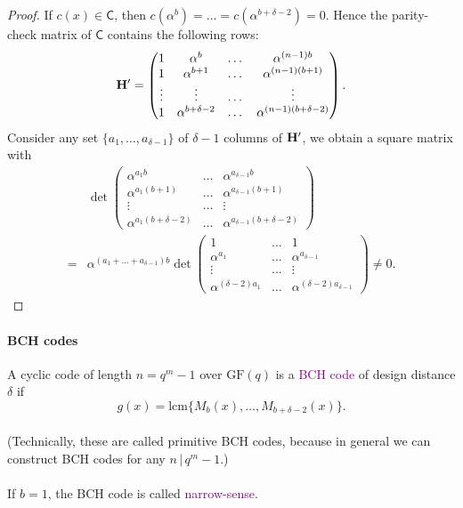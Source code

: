 \documentclass[a4paper, 11pt, openany]{book}
\numberwithin{equation}{section}
\theoremstyle{plain}
\theoremstyle{definition}
\newcommand{\GF}{\mathrm{GF}}
\newcommand{\lcm}{\mathrm{lcm}}
\newcommand{\Define}[1]{\textcolor{purple}{#1}}
\newcommand{\code}[1]{\mathsf{#1}}
\begin{document}
\begin{proof}
If $c(x) \in \code{C}$, then  $c(\alpha^b) = \dots = c(\alpha^{b + \delta - 2}) = 0.$ Hence the parity-check matrix of $\code{C}$ contains the following rows:
$$
	{\bf H}' = \begin{pmatrix}
	1 & \alpha^b &  \dots & \alpha^{(n-1)b}\\
	1 & \alpha^{b+1}  & \dots & \alpha^{(n-1)(b+1)}\\
	\vdots & \vdots & \dots & \vdots\\
	1 & \alpha^{b + \delta -2} & \dots & \alpha^{(n-1)(b + \delta-2)}
	\end{pmatrix}.
$$
Consider any set $\{ a_1, \dots, a_{\delta - 1} \}$ of $\delta - 1$ columns of ${\bf H}'$, we obtain a square matrix with
\begin{align*}
	&\det \begin{pmatrix}
	\alpha^{a_1 b} &  \dots & \alpha^{a_{\delta-1} b}\\
	\alpha^{a_1 (b+1)} & \dots & \alpha^{ a_{\delta-1} (b+1)}\\
	\vdots & \dots & \vdots\\
	\alpha^{a_1 (b + \delta -2) } & \dots & \alpha^{a_{\delta-1} (b + \delta -2)}
	\end{pmatrix}\\
	=& \alpha^{(a_1 + \dots + a_{\delta-1})b} \det \begin{pmatrix}
	1 &  \dots & 1\\
	\alpha^{a_1} & \dots & \alpha^{a_{\delta-1}}\\
	\vdots & \dots & \vdots\\
	\alpha^{(\delta -2) a_1} & \dots & \alpha^{(\delta-2) a_{\delta-1}}
	\end{pmatrix} \ne 0.
\end{align*}
\end{proof}


\paragraph{BCH codes}
A cyclic code of length $n = q^m - 1$ over $\GF(q)$ is a \Define{BCH code} of design distance $\delta$ if
$$
	g(x) = \lcm \{ M_b(x), \dots, M_{b + \delta - 2}(x) \}.
$$
~\\
(Technically, these are called primitive BCH codes, because in general we can construct BCH codes for any $n \, | \, q^m-1$.)\\
~\\
If $b=1$, the BCH code is called \Define{narrow-sense}.
\end{document}
